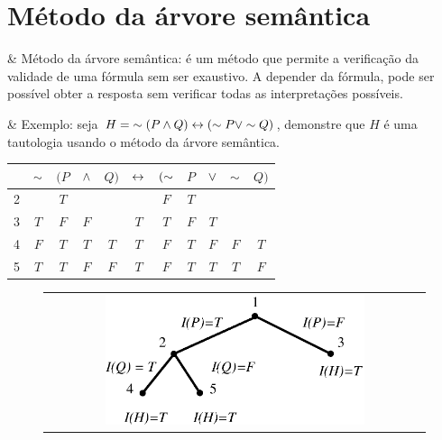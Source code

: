 \section{Método da árvore semântica}

\begin{easylist}
  & Método da árvore semântica: é um método que permite a verificação da validade de uma fórmula sem ser exaustivo. A depender da fórmula, pode ser possível obter a resposta sem verificar todas as interpretações possíveis.
  
  & Exemplo: seja $H = \; \sim(P \land Q) \leftrightarrow (\sim P \lor \sim Q)$, demonstre que $H$ é uma tautologia usando o método da árvore semântica.
\end{easylist}

\begin{center}
  \begin{tabular}{ c|cccccccccc }
        & $\sim$ & $(P$ & $\land$ & $Q)$ & $\leftrightarrow$ & $(\sim$ & $P$ & $\lor$ & $\sim$ & $Q)$ \\
    \hline
      2 &        & $T$  &        &      &        & $F$     & $T$ &       &        &      \\
    \hline
      3 & $T$    & $F$  & $F$    &      & $T$    & $T$     & $F$ & $T$   &        &      \\
    \hline
      4 & $F$    & $T$  & $T$    & $T$  & $T$    & $F$     & $T$ & $F$   & $F$    & $T$  \\
    \hline
      5 & $T$    & $T$  & $F$    & $F$  & $T$    & $F$     & $T$ & $T$   & $T$    & $F$  \\
  \end{tabular}
\end{center}

\begin{figure}[!h]
  \begin{center}
    \begin{tabular}{c}
      \includegraphics[width=0.7\textwidth]{images/04/tree_01.eps}
    \end{tabular}
  \end{center}
\end{figure}

